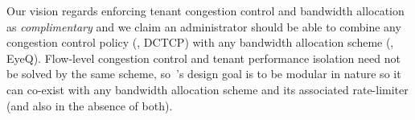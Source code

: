 Our vision regards enforcing tenant congestion control and bandwidth allocation as {\em complimentary} and we claim 
an administrator should be able to
combine any congestion control policy (\eg{}, DCTCP) with any bandwidth allocation scheme (\eg{}, EyeQ). 
Flow-level congestion control and tenant performance isolation need not be solved by the same scheme,
so~\acdc{}'s design goal is to be modular in nature so it can co-exist with any bandwidth allocation scheme
and its associated rate-limiter (and also in the absence of both). 

%
